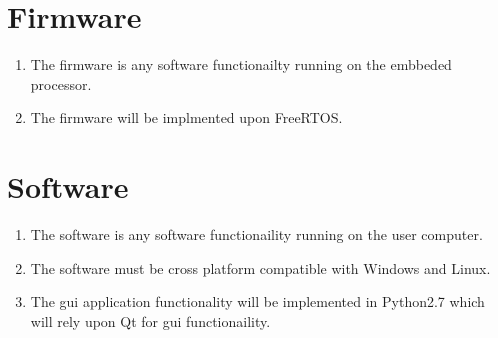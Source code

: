 \documentclass[12pt,a4paper]{article}
\begin{document}
\section{Firmware}
\begin{enumerate}[label*=\arabic*.]
\item The firmware is any software functionailty running on the embbeded processor.
\item The firmware will be implmented upon FreeRTOS.
\end{enumerate}


\section{Software}
\begin{enumerate}[label*=\arabic*.]
\item The software is any software functionaility running on the user computer.
\item The software must be cross platform compatible with Windows and Linux.
\item The \gls{gui} application functionality will be implemented in Python2.7 which will rely upon Qt for \gls{gui} functionaility.
\end{enumerate}
\end{document}
